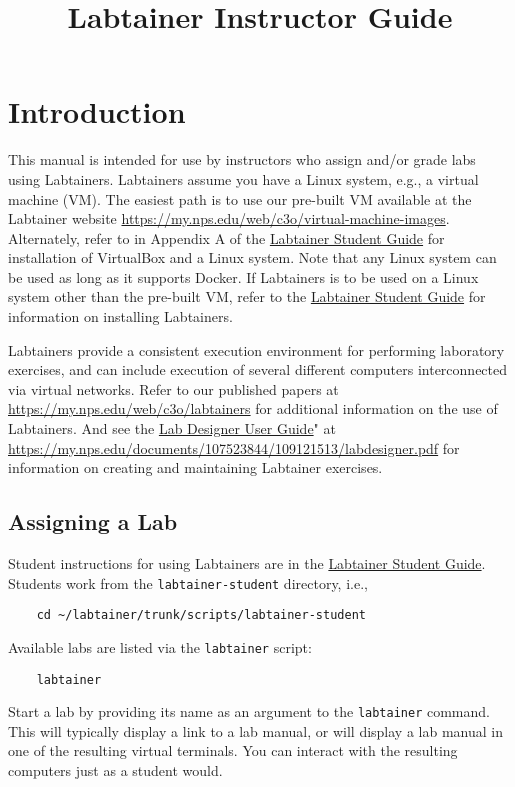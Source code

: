 \documentclass[12pt]{article}
\begin{document}
\title {Labtainer Instructor Guide\vspace{-4ex}}
\maketitle

\section {Introduction}
This manual is intended for use by instructors who assign and/or grade
labs using Labtainers.
Labtainers assume you have a Linux system, e.g., a virtual machine (VM).  
The easiest path is to use our pre-built VM available at the Labtainer
website \url{https://my.nps.edu/web/c3o/virtual-machine-images}.
Alternately, refer to
in Appendix A of the \underline{Labtainer Student Guide} for installation of VirtualBox 
and a Linux system.
Note that any Linux system can be used as long as it supports Docker.
If Labtainers is to be used on a Linux system other than the pre-built VM,
refer to the \underline{Labtainer Student Guide} for information on
installing Labtainers.

Labtainers provide a consistent execution environment for performing
laboratory exercises, and can include execution of several different
computers interconnected via virtual networks.  Refer to our published
papers at \url{https://my.nps.edu/web/c3o/labtainers} for additional information
on the use of Labtainers.  And see the \underline{Lab Designer User Guide}"
at \url{https://my.nps.edu/documents/107523844/109121513/labdesigner.pdf} for 
information on creating and maintaining Labtainer exercises.

\subsection{Assigning a Lab}
Student instructions for using Labtainers are in the \underline{Labtainer Student Guide}.  
Students work from the {\tt labtainer-student} directory, i.e.,
\begin{verbatim}
    cd ~/labtainer/trunk/scripts/labtainer-student
\end{verbatim}
Available labs are listed via the {\tt labtainer} script:
\begin{verbatim}
    labtainer
\end{verbatim}
\noindent Start a lab by providing its name as an argument to the {\tt labtainer} command.
This will typically display a link to a lab manual, or will display a lab manual in one of
the resulting virtual terminals.  You can interact with the resulting computers just as a
student would.
\end{document}
